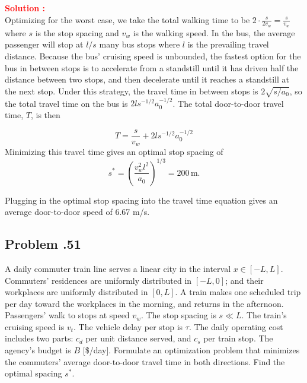 \documentclass[12pt]{article}
\newcommand{\customsubsection}[1]{
  \subsection*{Problem \thesection.#1}
}
\begin{document}
\textbf{\textcolor{red}{Solution :}} \\

Optimizing for the worst case, we take the total walking time to be \(2 \cdot\frac{s}{2v_w} = \frac{s}{v_w}\) where \(s\) is the stop spacing and \(v_w\) is the walking speed. In the bus, the average passenger will stop at \(l/s\) many bus stops where \(l\) is the prevailing travel distance. Because the bus' cruising speed is unbounded, the fastest option for the bus in between stops is to accelerate from a standstill until it has driven half the distance between two stops, and then decelerate until it reaches a standstill at the next stop. Under this strategy, the travel time in between stops is \(2\sqrt{s/a_0}\), so the total travel time on the bus is \(2ls^{-1/2}a_0^{-1/2}\). The total door-to-door travel time, \(T\), is then

\[
T = \frac{s}{v_w} + 2ls^{-1/2}a_0^{-1/2}
\]
Minimizing this travel time gives an optimal stop spacing of 
\[
s^\ast = \left( \frac{v_w^2 l^2}{a_0} \right)^{1/3} = 200\, \text{m}.
\]

Plugging in the optimal stop spacing into the travel time equation gives an average door-to-door speed of 6.67 m/s. 
\newpage

\customsubsection{51}


A daily commuter train line serves a linear city in the interval \(x \in [-L, L]\). Commuters’ residences are uniformly distributed in \([-L, 0]\); and their workplaces are uniformly distributed in \([0, L]\). A train makes one scheduled trip per day toward the workplaces in the morning, and returns in the afternoon. Passengers’ walk to stops at speed \(v_w\). The stop spacing is \(s \ll L \). The train's cruising speed is \(v_t\). The vehicle delay per stop is \(\tau\). The daily operating cost includes two parts: \(c_d\) per unit distance served, and \(c_s\) per train stop. The agency’s budget is \(B\) [\$/day]. Formulate an optimization problem that minimizes the commuters’ average door-to-door travel time in both directions. Find the optimal spacing \(s^\ast\).
\end{document}
